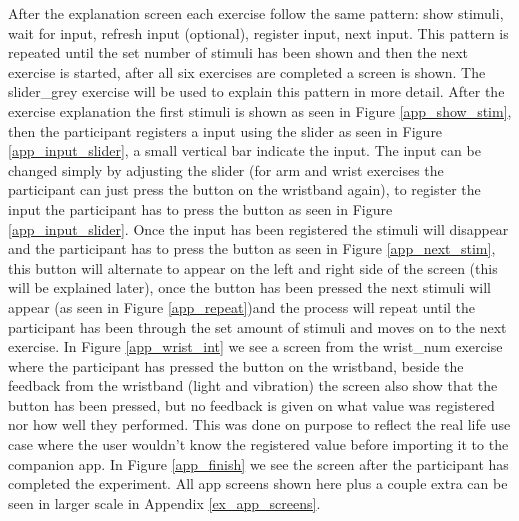 After the explanation screen each exercise follow the same pattern: show stimuli, wait for input, refresh input (optional), register input, next input. This pattern is repeated until the set number of stimuli has been shown and then the next exercise is started, after all six exercises are completed a  screen is shown. The slider\_grey exercise will be used to explain this pattern in more detail. After the exercise explanation the first stimuli is shown as seen in Figure \ref{app_show_stim}, then the participant registers a input using the slider as seen in Figure \ref{app_input_slider}, a small vertical bar indicate the input. The input can be changed simply by adjusting the slider (for arm and wrist exercises the participant can just press the button on the wristband again), to register the input the participant has to press the  button as seen in Figure \ref{app_input_slider}. Once the input has been registered the stimuli will disappear and the participant has to press the  button as seen in Figure \ref{app_next_stim}, this button will alternate to appear on the left and right side of the screen (this will be explained later), once the button has been pressed the next stimuli will appear (as seen in Figure \ref{app_repeat})and the process will repeat until the participant has been through the set amount of stimuli and moves on to the next exercise. In Figure \ref{app_wrist_int} we see a screen from the wrist\_num exercise where the participant has pressed the button on the wristband, beside the feedback from the wristband (light and vibration) the screen also show that the button has been pressed, but no feedback is given on what value was registered nor how well they performed. This was done on purpose to reflect the real life use case where the user wouldn't know the registered value before importing it to the companion app. In Figure \ref{app_finish} we see the  screen after the participant has completed the experiment. All app screens shown here plus a couple extra can be seen in larger scale in Appendix \ref{ex_app_screens}.

